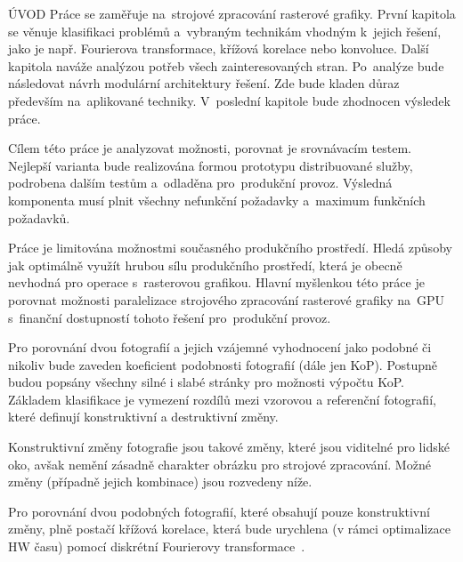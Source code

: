 
ÚVOD
Práce se zaměřuje na~strojové zpracování rasterové grafiky. První kapitola se věnuje klasifikaci problémů a~vybraným technikám vhodným k~jejich řešení, jako je např. Fourierova transformace, křížová korelace nebo konvoluce. Další kapitola naváže analýzou potřeb všech zainteresovaných stran. Po~analýze bude následovat návrh modulární architektury řešení. Zde bude kladen důraz především na~aplikované techniky. V~poslední kapitole bude zhodnocen výsledek práce.

Cílem této práce je analyzovat možnosti, porovnat je srovnávacím testem. Nejlepší varianta bude realizována formou prototypu distribuované služby, podrobena dalším testům a~odladěna pro~produkční provoz. Výsledná komponenta musí plnit všechny nefunkční požadavky a~maximum funkčních požadavků.

Práce je limitována možnostmi současného produkčního prostředí. Hledá způsoby jak optimálně využít hrubou sílu produkčního prostředí, která je obecně nevhodná pro operace s~rasterovou grafikou. Hlavní myšlenkou této práce je porovnat možnosti paralelizace strojového zpracování rasterové grafiky na~GPU s~finanční dostupností tohoto řešení pro~produkční provoz. 


Pro porovnání dvou fotografií a jejich vzájemné vyhodnocení jako podobné či nikoliv bude zaveden koeficient podobnosti fotografií (dále jen KoP). Postupně budou popsány všechny silné i slabé stránky pro možnosti výpočtu KoP. Základem klasifikace je vymezení rozdílů mezi vzorovou a referenční fotografií, které definují konstruktivní a destruktivní změny.

Konstruktivní změny fotografie jsou takové změny, které jsou viditelné pro lidské oko, avšak nemění zásadně charakter obrázku pro strojové zpracování. Možné změny (případně jejich kombinace) jsou rozvedeny níže.

Pro porovnání dvou podobných fotografií, které obsahují pouze konstruktivní změny, plně postačí křížová korelace, která bude urychlena (v rámci optimalizace HW času) pomocí diskrétní Fourierovy transformace~\cite{FFT}.

